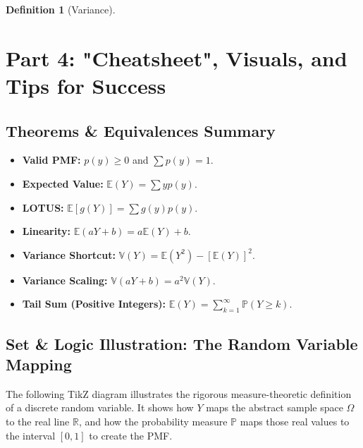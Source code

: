 \documentclass[11pt,letterpaper]{article}
\theoremstyle{definition}
\newtheorem{definition}{Definition}[section]
\theoremstyle{plain}
\theoremstyle{remark}
\newcommand{\E}{\mathbb{E}}
\newcommand{\V}{\mathbb{V}}
\newcommand{\R}{\mathbb{R}}
\newcommand{\Prob}{\mathbb{P}}
\begin{document}
\begin{definition}[Variance]
\newpage
\section{Part 4: "Cheatsheet", Visuals, and Tips for Success}

\subsection{Theorems \& Equivalences Summary}
\begin{itemize}
    \item \textbf{Valid PMF:} $p(y) \ge 0$ and $\sum p(y) = 1$.
    \item \textbf{Expected Value:} $\E(Y) = \sum y p(y)$.
    \item \textbf{LOTUS:} $\E[g(Y)] = \sum g(y) p(y)$.
    \item \textbf{Linearity:} $\E(aY + b) = a\E(Y) + b$.
    \item \textbf{Variance Shortcut:} $\V(Y) = \E(Y^2) - [\E(Y)]^2$.
    \item \textbf{Variance Scaling:} $\V(aY + b) = a^2 \V(Y)$.
    \item \textbf{Tail Sum (Positive Integers):} $\E(Y) = \sum_{k=1}^\infty \Prob(Y \ge k)$.
\end{itemize}

\subsection{Set \& Logic Illustration: The Random Variable Mapping}
The following TikZ diagram illustrates the rigorous measure-theoretic definition of a discrete random variable. It shows how $Y$ maps the abstract sample space $\Omega$ to the real line $\R$, and how the probability measure $\Prob$ maps those real values to the interval $[0,1]$ to create the PMF.

\vspace{0.5cm}
\begin{center}
\begin{tikzpicture}[
    >=Stealth,
    node distance=3cm,
    every node/.style={font=\sffamily},
    space/.style={ellipse, draw, minimum width=2.5cm, minimum height=3.5cm, fill=blue!5},
    real/.style={rectangle, draw, minimum width=1cm, minimum height=4cm, fill=green!5},
    prob/.style={rectangle, draw, minimum width=1cm, minimum height=4cm, fill=red!5}
]


\end{tikzpicture}
\end{center}
\end{definition}
\end{document}
